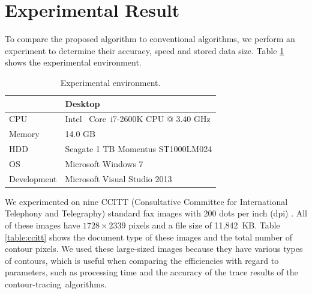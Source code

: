 \documentclass[sensors,article,accept,moreauthors,pdftex,10pt,a4paper]{mdpi}
\begin{document}
\section{Experimental Result}


To compare the proposed algorithm to conventional algorithms, we perform an experiment to determine their accuracy, speed and stored data size. Table \ref{table:exp_environment} shows the experimental environment.

\begin{table}[H]
	\centering
	\begin{tabular}{ll}
		\toprule
		 & \textbf{Desktop} \\ 
		\midrule
		CPU & Intel\textregistered~ Core\texttrademark~i7-2600K CPU @%
		3.40 GHz \\
		Memory & 14.0 GB \\ 
		HDD%
		& Seagate 1 TB Momentus ST1000LM024 \\
		OS & Microsoft Windows 7 \\
		Development & Microsoft Visual Studio 2013 \\ 
		\bottomrule
	\end{tabular}
	\caption{Experimental environment.}
	\label{table:exp_environment}
\end{table}	


We experimented on nine CCITT (Consultative Committee for International Telephony and Telegraphy) standard fax images with 200 dots per inch (dpi) \cite{Miyatake1997Contour}. All of these images have $1728 \times 2339$ pixels and a file size of 11,842~KB. Table \ref{table:ccitt} shows the document type of these images and the total number of contour pixels. We used these large-sized images because they have various types of contours, which is useful when comparing the efficiencies with regard to parameters, such as processing time and the accuracy of the trace results of the contour-tracing~algorithms.
\end{document}
